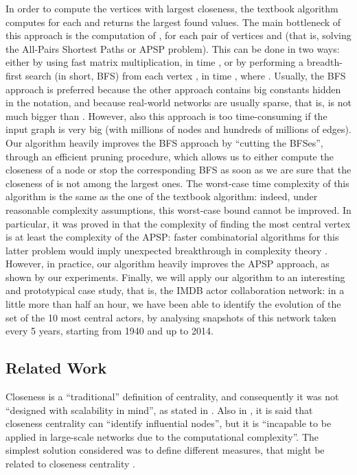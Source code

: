 \documentclass{acm_proc_article-sp}
\begin{document}
In order to compute the  vertices with largest closeness, the textbook algorithm computes  for each  and returns the  largest found values. The main bottleneck of this approach is the computation of , for each pair of vertices  and  (that is, solving the All-Pairs Shortest Paths or APSP problem). This can be done in two ways: either by using fast matrix multiplication, in time  \cite{Williams2012}, or by performing a breadth-first search (in short, BFS) from each vertex , in time , where . Usually, the BFS approach is preferred because the other approach contains big constants hidden in the  notation, and because real-world networks are usually sparse, that is,  is not much bigger than . However, also this approach is too time-consuming if the input graph is very big (with millions of nodes and hundreds of millions of edges). Our algorithm heavily improves the BFS approach by ``cutting the BFSes'', through an efficient pruning procedure, which allows us to either compute the closeness of a node  or stop the corresponding BFS as soon as we are sure that the closeness of  is not among the  largest ones. The worst-case time complexity of this algorithm is the same as the one of the textbook algorithm: indeed, under reasonable complexity assumptions, this worst-case bound cannot be improved. In particular, it was proved in \cite{Abboud2015} that the complexity of finding the most central vertex is at least the complexity of the APSP: faster combinatorial algorithms for this latter problem would imply unexpected breakthrough in complexity theory \cite{Williams2010}. However, in practice, our algorithm heavily improves the APSP approach, as shown by our experiments. Finally, we will apply our algorithm to an interesting and prototypical case study, that is, the IMDB actor collaboration network: in a little more than half an hour, we have been able to identify the evolution of the set of the 10 most central actors, by analysing snapshots of this network taken every 5 years, starting from 1940 and up to 2014.

\subsection{Related Work}

Closeness is a ``traditional'' definition of centrality, and consequently it was not ``designed with scalability in mind'', as stated in \cite{Kang2011}. Also in \cite{Chen2012}, it is said that closeness centrality can ``identify influential nodes'', but it is ``incapable to be applied in large-scale networks due to the computational complexity''. The simplest solution considered was to define different measures, that might be related to closeness centrality \cite{Kang2011}.
\end{document}
